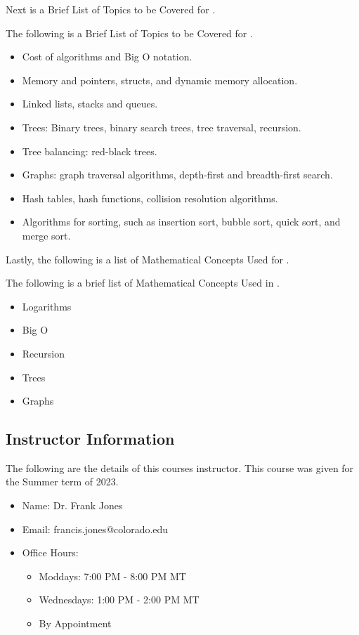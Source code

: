 Next is a Brief List of Topics to be Covered for \CSPBDataStruct.
\begin{solution}
\noindent The following is a Brief List of Topics to be Covered for \CSPBDataStruct.
    \begin{itemize}
        \item Cost of algorithms and Big O notation.
        \item Memory and pointers, structs, and dynamic memory allocation.
        \item Linked lists, stacks and queues.
        \item Trees: Binary trees, binary search trees, tree traversal, recursion.
        \item Tree balancing: red-black trees.
        \item Graphs: graph traversal algorithms, depth-first and breadth-first search.
        \item Hash tables, hash functions, collision resolution algorithms.
        \item Algorithms for sorting, such as insertion sort, bubble sort, quick sort, and merge sort.
    \end{itemize}
\end{solution}

Lastly, the following is a list of Mathematical Concepts Used for \CSPBDataStruct.
\begin{solution}
\noindent The following is a brief list of Mathematical Concepts Used in \CSPBDataStruct.
    \begin{itemize}
        \item Logarithms
        \item Big O
        \item Recursion
        \item Trees
        \item Graphs
    \end{itemize}
\end{solution}

\subsection{Instructor Information}
The following are the details of this courses instructor. This course was given for the Summer term of 2023.
\begin{itemize}
    \item Name: Dr. Frank Jones
    \item Email: francis.jones@colorado.edu
    \item Office Hours:
    \begin{itemize}
        \item Moddays: 7:00 PM - 8:00 PM MT
        \item Wednesdays: 1:00 PM - 2:00 PM MT
        \item By Appointment
    \end{itemize}
\end{itemize}

